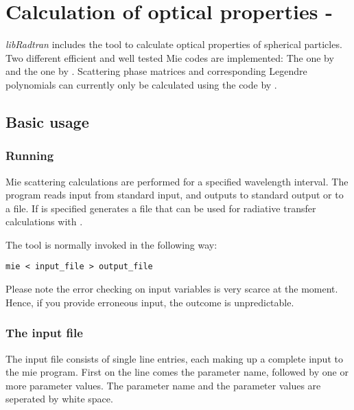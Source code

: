 \chapter{Calculation of optical properties - }
\label{sec:optprop}


{\sl libRadtran} includes the tool  to calculate optical
properties of spherical particles. Two different efficient and well
tested Mie codes are implemented: The
one by \citet{wiscombe80a} and the one by \citet{bohren1998}. Scattering phase matrices and
corresponding Legendre polynomials can currently only be calculated
using the code by \citet{wiscombe80a}.

\section{Basic usage}

\subsection{Running }

Mie scattering calculations are performed for a specified
wavelength interval. The  program reads input from standard input, 
and outputs to standard output or to a file. If
 is specified  generates a file
that can be used for radiative transfer calculations with
.

The  tool is normally invoked in the following
way: 

\begin{Verbatim}[fontsize=\footnotesize]   
  mie < input_file > output_file 
\end{Verbatim}

 Please note the error checking on input variables 
is very scarce at the moment. Hence, if you provide erroneous input, 
the outcome is unpredictable.

\subsection{The  input file}

The  input file consists of single line entries, each making
up a complete input to the mie program. First on the line comes
the parameter name, followed by one or more parameter values. The 
parameter name and the parameter values are seperated by white space.

